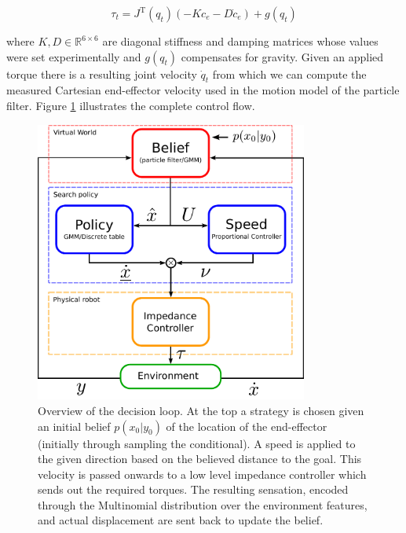 \begin{equation}\label{eq:ch3:torque_control}
 \tau_t = J^{\mathrm{T}}(q_t)\left(-K c_e - D \dot{c}_e \right) + g(q_t)
\end{equation}

where $K,D \in \mathbb{R}^{6\times6}$ are diagonal stiffness and damping matrices whose values were set experimentally 
and $g(q_t)$ compensates for gravity. Given an applied torque there is a resulting joint velocity $\dot{q}_t$ from which we can compute the 
measured Cartesian end-effector velocity used in the motion model of the particle filter. 
Figure \ref{fig:ch3:control_flow} illustrates the complete control flow.

\begin{figure}
\centering
  \includegraphics[width=0.8\textwidth]{./ch3-Search/Figures/Control_schematics}
  \caption{Overview of the decision loop. At the top a strategy is chosen given an initial belief
$p(x_{0}|y_{0})$ of the location of the end-effector (initially through sampling the conditional). 
A speed is applied to the given direction based on the believed distance
to the goal. This velocity is passed onwards to
a low level impedance controller which sends out the required torques. The
resulting sensation, encoded through the Multinomial distribution over
  the environment features, and actual displacement are sent back to update the
belief.}
  \label{fig:ch3:control_flow}
\end{figure}
\FloatBarrier
